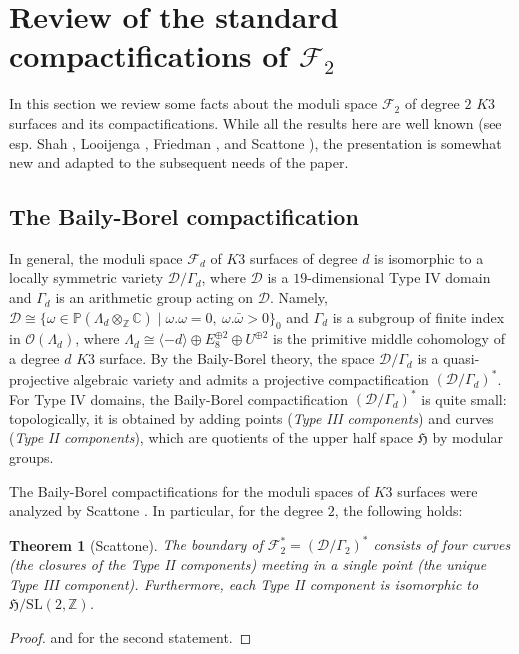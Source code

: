 \documentclass{amsart}
\numberwithin{equation}{section}
\theoremstyle{plain}
\newtheorem{theorem}[equation]{Theorem}
\theoremstyle{remark}
\theoremstyle{definition}
\newcommand{\bP}{\mathbb{P}}
\newcommand{\bZ}{\mathbb{Z}}
\newcommand{\bC}{\mathbb{C}}
\newcommand{\fH}{\mathfrak{H}}
\newcommand{\calF}{\mathcal{F}}
\newcommand{\calO}{\mathcal{O}}
\newcommand{\calD}{\mathcal{D}}
\newcommand{\SL}{\mathrm{SL}}
\begin{document}
\section{Review of the standard compactifications of $\calF_2$}\label{sectreview}
In this section we review some facts about the moduli space $\calF_2$ of degree $2$ $K3$ surfaces and its compactifications. While all the results here are  well known (see esp. Shah \cite{shah},  Looijenga \cite{looijengavancouver}, Friedman \cite{friedmanannals}, and Scattone \cite{scattone}), the presentation is somewhat new and adapted to the subsequent needs of the paper. 


\subsection{The Baily-Borel compactification}\label{sectbb} 
In general,  the  moduli space $\calF_d$ of $K3$ surfaces of degree $d$  is isomorphic to a locally symmetric variety $\calD/\Gamma_d$, where $\calD$ is a $19$-dimensional Type IV domain and $\Gamma_d$ is an arithmetic group acting on $\calD$. Namely, $\calD\cong \{\omega\in \bP(\Lambda_d\otimes_\bZ \bC) \mid \omega.\omega=0, \ \omega.\bar{\omega}>0\}_0$ and $\Gamma_d$ is a subgroup of finite index in $\calO(\Lambda_d)$, where $\Lambda_d\cong \langle -d\rangle\oplus E_8^{\oplus 2}\oplus U^{\oplus 2}$ is the primitive middle cohomology of a degree $d$ $K3$ surface. By the Baily-Borel theory, the space $\calD/\Gamma_d$ is a quasi-projective algebraic variety and admits a projective compactification $(\calD/\Gamma_d)^*$. For Type IV domains, the Baily-Borel compactification  $(\calD/\Gamma_d)^*$ is quite small: topologically, it is obtained by adding points ({\it Type III components}) and curves ({\it Type II components}), which are quotients of the upper half space $\fH$ by modular groups. 

The Baily-Borel compactifications for the moduli spaces of $K3$ surfaces were analyzed by Scattone \cite{scattone}. In particular, for the degree $2$, the following holds:
\begin{theorem}[Scattone]\label{thmbb}
The boundary of $\calF_2^*=(\calD/\Gamma_2)^*$ consists of four curves (the closures of the Type II components) meeting in a single point (the unique Type III component). Furthermore, each Type II component is isomorphic to $\fH/\SL(2,\bZ)$. 
\end{theorem}
\begin{proof}
\cite[\S6.2]{scattone} and \cite[\S5.7, esp. Fig. 5.5.7]{scattone} for the second statement.
\end{proof}
\end{document}
